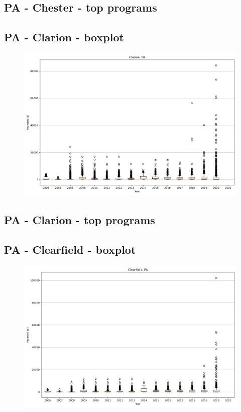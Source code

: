 \subsection*{PA - Chester - top programs}

\newpage
\subsection*{PA - Clarion - boxplot}
\begin{figure}[h]
\centering
\includegraphics[width=7in]{../output/boxplots/counties/Clarion-PA_boxplot.png}
\end{figure}


\subsection*{PA - Clarion - top programs}

\newpage
\subsection*{PA - Clearfield - boxplot}
\begin{figure}[h]
\centering
\includegraphics[width=7in]{../output/boxplots/counties/Clearfield-PA_boxplot.png}
\end{figure}


